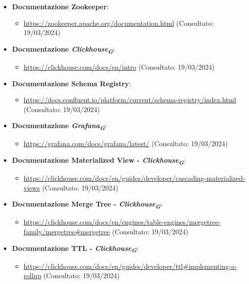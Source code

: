 \begin{itemize}
\begin{itemize}
    \end{itemize}
    \item \textbf{Documentazione Zookeeper}: 
    \begin{itemize}
        \item \url{https://zookeeper.apache.org/documentation.html} (Consultato: 19/03/2024)
    \end{itemize}
    \item \textbf{Documentazione \textit{Clickhouse}\textsubscript{\textit{G}}}: 
    \begin{itemize}
        \item \url{https://clickhouse.com/docs/en/intro} (Consultato: 19/03/2024)
    \end{itemize}
    \item \textbf{Documentazione Schema Registry}: 
    \begin{itemize}
        \item \url{https://docs.confluent.io/platform/current/schema-registry/index.html} (Consultato: 19/03/2024)
    \end{itemize}
    \item \textbf{Documentazione \textit{Grafana}\textsubscript{\textit{G}}}: 
    \begin{itemize}
        \item \url{https://grafana.com/docs/grafana/latest/} (Consultato: 19/03/2024)
    \end{itemize}
    \item \textbf{Documentazione Materialized View - \textit{Clickhouse}\textsubscript{\textit{G}}}: 
    \begin{itemize}
        \item \url{https://clickhouse.com/docs/en/guides/developer/cascading-materialized-views} (Consultato: 19/03/2024)
    \end{itemize}
    \item \textbf{Documentazione Merge Tree - \textit{Clickhouse}\textsubscript{\textit{G}}}: 
    \begin{itemize}
        \item \url{https://clickhouse.com/docs/en/engines/table-engines/mergetree-family/mergetree#mergetree} (Consultato: 19/03/2024)
    \end{itemize}
    \item \textbf{Documentazione TTL - \textit{Clickhouse}\textsubscript{\textit{G}}}: 
    \begin{itemize}
        \item \url{https://clickhouse.com/docs/en/guides/developer/ttl#implementing-a-rollup} (Consultato: 19/03/2024)

\end{itemize}
\end{itemize}
